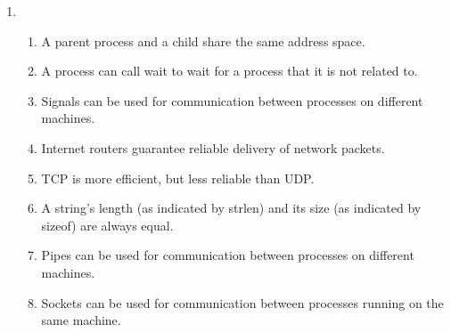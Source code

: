\documentclass[11pt]{article}
\newcommand{\trueorfalse}[1]{%
	\hspace{0.47cm}\ifthenelse{\equal{#1}{T}}%
	{\begin{minipage}[t]{0.1\textwidth}
			\item[$\boxtimes$] True
		\end{minipage}
		\begin{minipage}[t]{0.1\textwidth}
			\item[$\square$] False
	\end{minipage}}%
	{\begin{minipage}[t]{0.1\textwidth}
			\item[$\square$] True
		\end{minipage}
		\begin{minipage}[t]{0.1\textwidth}
			\item[$\boxtimes$] False
	\end{minipage}}%
}
\begin{document}
\begin{enumerate}
	\item \begin{enumerate}
		\item A parent process and a child share the same address space.
		\item A process can call wait to wait for a process that it is not related to.
		\item Signals can be used for communication between processes on different machines.
		\item Internet routers guarantee reliable delivery of network packets.
		\item TCP is more efficient, but less reliable than UDP.
		\item A string’s length (as indicated by strlen) and its size (as indicated by sizeof) are always equal.
		\item Pipes can be used for communication between processes on different machines.
		\item Sockets can be used for communication between processes running on the same machine.
	\end{enumerate}


\end{enumerate}
\end{document}
